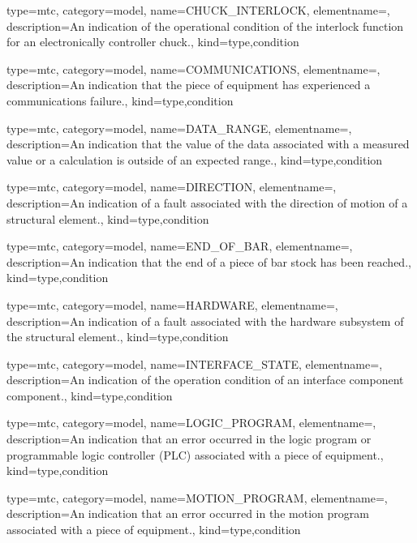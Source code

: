 {
  type=mtc,
  category=model,
  name={CHUCK\_INTERLOCK},
  elementname=,
  description={An indication of the operational condition of the interlock function for an electronically controller chuck.},
  kind={type,condition}
}


{
  type=mtc,
  category=model,
  name={COMMUNICATIONS},
  elementname=,
  description={An indication that the piece of equipment has experienced a communications failure.},
  kind={type,condition}
}


{
  type=mtc,
  category=model,
  name={DATA\_RANGE},
  elementname=,
  description={An indication that the value of the data associated with a measured value or a calculation is outside of an expected range.},
  kind={type,condition}
}


{
  type=mtc,
  category=model,
  name={DIRECTION},
  elementname=,
  description={An indication of a fault associated with the direction of motion of a \gls{structural element}.},
  kind={type,condition}
}


{
  type=mtc,
  category=model,
  name={END\_OF\_BAR},
  elementname=,
  description={An indication that the end of a piece of bar stock has been reached.},
  kind={type,condition}
}


{
  type=mtc,
  category=model,
  name={HARDWARE},
  elementname=,
  description={An indication of a fault associated with the hardware subsystem of the \gls{structural element}.},
  kind={type,condition}
}


{
  type=mtc,
  category=model,
  name={INTERFACE\_STATE},
  elementname=,
  description={An indication of the operation condition of an \gls{interface component} component.},
  kind={type,condition}
}


{
  type=mtc,
  category=model,
  name={LOGIC\_PROGRAM},
  elementname=,
  description={An indication that an error occurred in the logic program or programmable logic controller (PLC) associated with a piece of equipment.},
  kind={type,condition}
}


{
  type=mtc,
  category=model,
  name={MOTION\_PROGRAM},
  elementname=,
  description={An indication that an error occurred in the motion program associated with a piece of equipment.},
  kind={type,condition}
}


